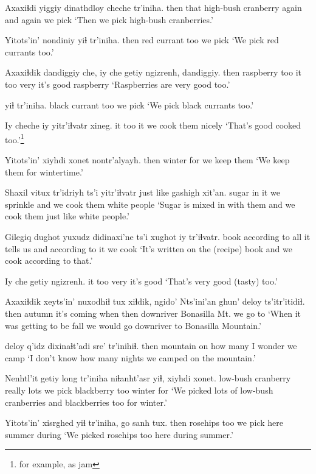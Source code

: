 \documentclass[12pt]{article}
\begin{document}
\gll Axaxiɬdi yiggiy dinathdloy cheche tr'iniha.
then  that {high-bush cranberry} {again and again} {we pick}
\glt `Then we pick high-bush cranberries.'
\glend

\gll Yitots'in' nondiniy    yiɬ tr'iniha.
then       {red currant} too {we pick}
\glt `We pick red currants too.'
\glend

\gll Axaxiɬdik dandiggiy che, iy che getiy ngizrenh, dandiggiy.
then      raspberry too  it too very {it's good} raspberry
\glt `Raspberries are very good too.'
\glend

 yiɬ tr'iniha.
{black currant} too {we pick}
\glt `We pick black currants too.'
\glend

\gll Iy cheche iy yitr'iɬvatr xineg.
it too it    {we cook them} nicely
\glt `That's good cooked too.'\footnote{for example, as jam}
\glend

\gll Yitots'in' xiyhdi xonet nontr'alyayh.
then winter for        {we keep them} 
\glt `We keep them for wintertime.'
\glend

\gll Shaxil vitux tr'idriyh ts'i yitr'iɬvatr {just like} gashigh xit'an.
sugar  {in it} {we sprinkle} and {we cook them} {} white people
\glt `Sugar is mixed in with them and we cook them just like white people.'
\glend

\gll Gilegiq dughot yuxudz didinaxi'ne ts'i xughot iy tr'iɬvatr. 
book {according to} all {it tells us} and {according to} it {we cook}
\glt `It's written on the (recipe) book and we cook according to that.'
\glend

\gll Iy che getiy ngizrenh.
it too very {it's good}
\glt `That's very good (tasty) too.'
\glend

\gll Axaxiɬdik xeyts'in' nuxodhiɬ tux xiɬdik, ngido' {Nts'ini'an ghun' deloy} ts'itr'itidiɬ.
then autumn {it's coming} when then downriver {Bonasilla Mt.}          {we go to}
\glt `When it was getting to be fall we would go downriver to Bonasilla Mountain.'
\glend

 deloy q'idz dixinaɬt'adi sre' tr'inihiɬ.
then mountain on {how many} {I wonder} {we camp}
\glt `I don't know how many nights we camped on the mountain.'
\glend

\gll Nenhtl'it getiy long tr'iniha niɬanht'asr yiɬ, xiyhdi xonet.
{low-bush cranberry} really lots {we pick} {blackberry} too winter for
\glt `We picked lots of low-bush cranberries and blackberries too for winter.'
\glend

\gll Yitots'in' xisrghed yiɬ tr'iniha, go sanh tux.
then rosehips too {we pick} here summer during
\glt `We picked rosehips too here during summer.'
\glend
\end{document}

